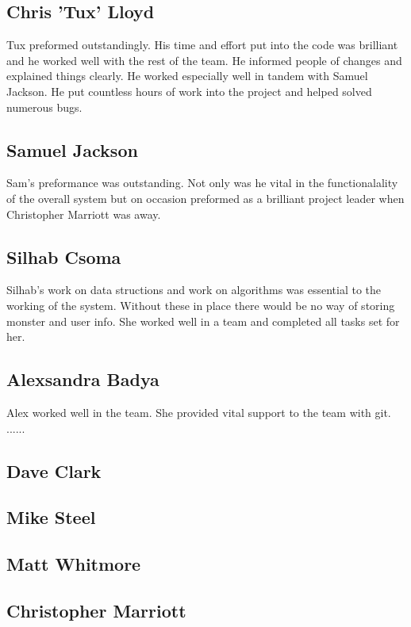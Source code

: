 \documentclass{project}
\begin{document}
\subsection{Chris 'Tux' Lloyd}
Tux preformed outstandingly. His time and effort put into the code was brilliant and he worked well with the rest of the team. He informed people of changes and explained things clearly. He worked especially well in tandem with Samuel Jackson. He put countless hours of work into the project and helped solved numerous bugs.

\subsection{Samuel Jackson}
Sam's preformance was outstanding. Not only was he vital in the functionalality of the overall system but on occasion preformed as a brilliant project leader when Christopher Marriott was away. 

\subsection{Silhab Csoma}
Silhab's work on data structions and work on algorithms was essential to the working of the system. Without these in place there would be no way of storing monster and user info. She worked well in a team and completed all tasks set for her.

\subsection{Alexsandra Badya}
Alex worked well in the team. She provided vital support to the team with git. ......

\subsection{Dave Clark}


\subsection{Mike Steel}


\subsection{Matt Whitmore}


\subsection{Christopher Marriott}
\end{document}
